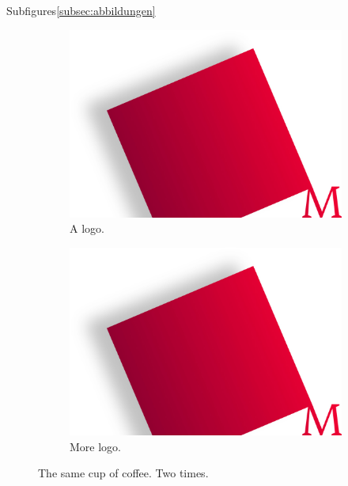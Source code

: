\documentclass[\mainsize, a4paper, fleqn, xcolor=dvipsnames]{scrartcl}
\begin{document}
	Subfigures\autoref{subsec:abbildungen}
	
	\begin{figure}[h]
  		\centering
  		\begin{subfigure}[b]{0.4\textwidth}
    		\includegraphics[width=\textwidth]{logo}
    		\caption{A logo.}
  		\end{subfigure}
  		\begin{subfigure}[b]{0.4\textwidth}
    		\includegraphics[width=\textwidth]{logo}
    		\caption{More logo.}
  		\end{subfigure}
  		\caption{The same cup of coffee. Two times.}
  		\label{fig:coffee}
	\end{figure}
	
\end{document}
